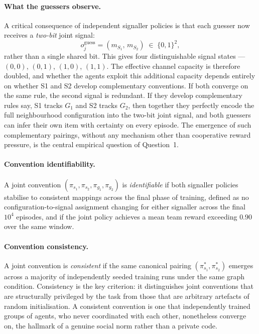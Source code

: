 \documentclass[a4paper,twoside,12pt]{report}
\begin{document}
    
    \paragraph{What the guessers observe.}
    A critical consequence of independent signaller policies is that each guesser
    now receives a \emph{two-bit} joint signal:
    \begin{equation}
        o_j^{\mathrm{guess}} = (m_{S_1},\, m_{S_2}) \;\in\; \{0,1\}^2,
    \end{equation}
    rather than a single shared bit. This gives four distinguishable signal
    states --- $(0,0)$, $(0,1)$, $(1,0)$, $(1,1)$. The effective channel capacity is therefore doubled,
    and whether the agents exploit this additional capacity depends entirely on
    whether S1 and S2 develop complementary conventions. If both converge on the
    same rule, the second signal is redundant. If they
    develop complementary rules say, S1 tracks $G_1$ and S2
    tracks $G_2$,  then together they perfectly encode the full
    neighbourhood configuration into the two-bit joint signal, and both guessers
    can infer their own item with certainty on every episode. The emergence of
    such complementary pairings, without any mechanism other than cooperative
    reward pressure, is the central empirical question of Question~1.
    
    \paragraph{Convention identifiability.}
    A joint convention $(\pi_{s_1}, \pi_{s_2}, \pi_{g_1}, \pi_{g_2})$ is
    \emph{identifiable} if both signaller policies stabilise to consistent
    mappings across the final phase of training, defined as no
    configuration-to-signal assignment changing for either signaller across the
    final $10^4$ episodes, and if the joint policy achieves a mean team reward
    exceeding $0.90$ over the same window.
    
    \paragraph{Convention consistency.}
    A joint convention is \emph{consistent} if the same canonical pairing
    $(\pi_{s_1}^*, \pi_{s_2}^*)$ emerges across a majority of independently
    seeded training runs under the same graph condition. Consistency is the key
    criterion: it distinguishes joint conventions that are structurally privileged
    by the task from those that are arbitrary artefacts of random
    initialisation. A consistent convention is one that independently trained
    groups of agents, who never coordinated with each other, nonetheless converge
    on, the hallmark of a genuine social norm rather than a private code.
    
\end{document}
